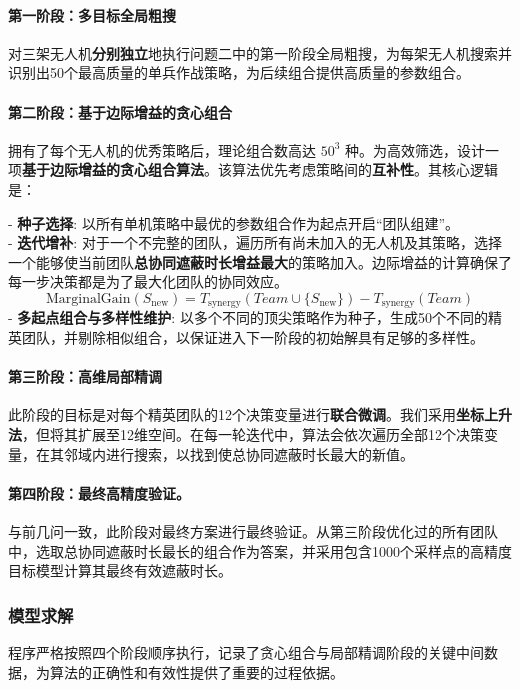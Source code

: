 \documentclass[12pt]{article}
\begin{document}
\begin{CJK}{UTF8}{gbsn}
		\paragraph{第一阶段：多目标全局粗搜}
		对三架无人机\textbf{分别独立}地执行问题二中的第一阶段全局粗搜，为每架无人机搜索并识别出50个最高质量的单兵作战策略，为后续组合提供高质量的参数组合。
		
		\paragraph{第二阶段：基于边际增益的贪心组合}
		拥有了每个无人机的优秀策略后，理论组合数高达 $50^3$ 种。为高效筛选，设计一项\textbf{基于边际增益的贪心组合算法}。该算法优先考虑策略间的\textbf{互补性}。其核心逻辑是：
		
		\indent - \textbf{种子选择}: 以所有单机策略中最优的参数组合作为起点开启“团队组建”。\\
		\indent - \textbf{迭代增补}: 对于一个不完整的团队，遍历所有尚未加入的无人机及其策略，选择一个能够使当前团队\textbf{总协同遮蔽时长增益最大}的策略加入。边际增益的计算确保了每一步决策都是为了最大化团队的协同效应。\\
		\begin{equation}
			\text{MarginalGain}(S_{\text{new}}) = T_{\text{synergy}}(Team \cup \{S_{\text{new}}\}) - T_{\text{synergy}}(Team)
		\end{equation}
		\indent - \textbf{多起点组合与多样性维护}: 以多个不同的顶尖策略作为种子，生成50个不同的精英团队，并剔除相似组合，以保证进入下一阶段的初始解具有足够的多样性。
		
		
		\paragraph{第三阶段：高维局部精调}
		此阶段的目标是对每个精英团队的12个决策变量进行\textbf{联合微调}。我们采用\textbf{坐标上升法}，但将其扩展至12维空间。在每一轮迭代中，算法会依次遍历全部12个决策变量，在其邻域内进行搜索，以找到使总协同遮蔽时长最大的新值。
		
		\paragraph{第四阶段：最终高精度验证。}
		与前几问一致，此阶段对最终方案进行最终验证。从第三阶段优化过的所有团队中，选取总协同遮蔽时长最长的组合作为答案，并采用包含1000个采样点的高精度目标模型计算其最终有效遮蔽时长。
		
		
		\subsubsection{模型求解}
		程序严格按照四个阶段顺序执行，记录了贪心组合与局部精调阶段的关键中间数据，为算法的正确性和有效性提供了重要的过程依据。
		

\end{CJK}
\end{document}
